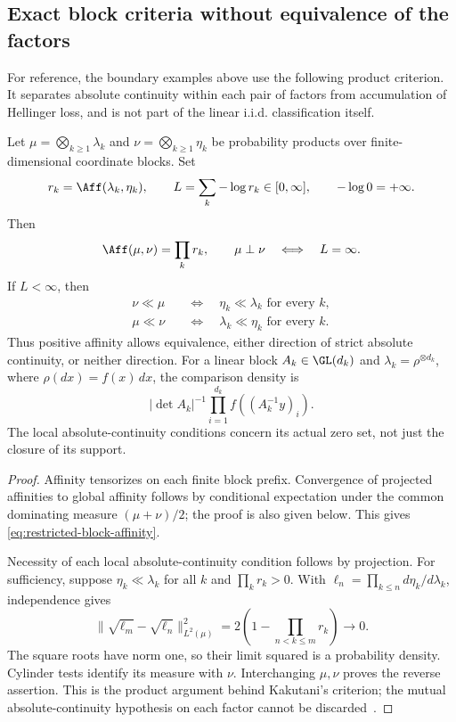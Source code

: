 \subsection{Exact block criteria without equivalence of the factors}
\label{sec:restricted-blocks}

For reference, the boundary examples above use the following product
criterion.
It separates absolute continuity within each pair of factors from
accumulation of Hellinger loss, and is not part of the linear i.i.d.
classification itself.

\begin{theorem}
\label{thm:block-kakutani}
Let \(\mu=\bigotimes_{k\geq1}\lambda_k\) and
\(\nu=\bigotimes_{k\geq1}\eta_k\) be probability products over
finite-dimensional coordinate blocks.
Set
\[
 r_k=\Aff(\lambda_k,\eta_k),\qquad
 L=\sum_k-\log r_k\in[0,\infty],
 \qquad -\log0=+\infty.
\]
Then
\begin{equation}
 \Aff(\mu,\nu)=\prod_kr_k,\qquad
 \mu\perp\nu\quad\Longleftrightarrow\quad L=\infty.
 \label{eq:restricted-block-affinity}
\end{equation}
If \(L<\infty\), then
\begin{equation}
 \begin{aligned}
  \nu\ll\mu&\quad\Longleftrightarrow\quad
                         \eta_k\ll\lambda_k\text{ for every }k,\\
  \mu\ll\nu&\quad\Longleftrightarrow\quad
                         \lambda_k\ll\eta_k\text{ for every }k.
 \end{aligned}
 \label{eq:restricted-block-ac}
\end{equation}
Thus positive affinity allows equivalence, either direction of strict
absolute continuity, or neither direction.
For a linear block \(A_k\in\GL(d_k)\) and
\(\lambda_k=\rho^{\otimes d_k}\), where \(\rho(dx)=f(x)\,dx\),
the comparison density is
\[
 |\det A_k|^{-1}\prod_{i=1}^{d_k}
                         f((A_k^{-1}y)_i).
\]
The local absolute-continuity conditions concern its actual zero
set, not just the closure of its support.
\end{theorem}
\begin{proof}
Affinity tensorizes on each finite block prefix.
Convergence of projected affinities to global affinity follows by
conditional expectation under the common dominating measure
\((\mu+\nu)/2\); the proof is also given below.
This gives \eqref{eq:restricted-block-affinity}.

Necessity of each local absolute-continuity condition follows by
projection.
For sufficiency, suppose \(\eta_k\ll\lambda_k\) for all \(k\) and
\(\prod_kr_k>0\).
With \(\ell_n=\prod_{k\leq n}d\eta_k/d\lambda_k\), independence gives
\[
 \|\sqrt{\ell_m}-\sqrt{\ell_n}\|_{L^2(\mu)}^2
       =2\left(1-\prod_{n<k\leq m}r_k\right)\longrightarrow0.
\]
The square roots have norm one, so their limit squared is a
probability density.
Cylinder tests identify its measure with \(\nu\).
Interchanging \(\mu,\nu\) proves the reverse assertion.
This is the product argument behind Kakutani's criterion; the
mutual absolute-continuity hypothesis on each factor cannot be
discarded~\cite{kakutani1948equivalence,shepp1965translate}.
\end{proof}

